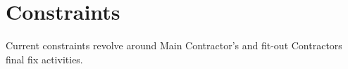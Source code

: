 \section{Constraints}
Current constraints revolve around Main Contractor's and fit-out Contractors final fix activities. 




